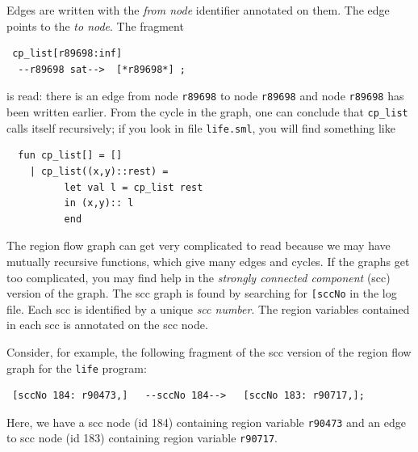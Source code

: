 \documentclass[12pt]{book}
\begin{document}
Edges are written with the {\em from node\/} identifier annotated on
them. The edge points to the \emph{to node}. The fragment
\begin{verbatim}
 cp_list[r89698:inf]
  --r89698 sat-->  [*r89698*] ;
\end{verbatim}
is read: there is an edge from node \texttt{r89698} to node
\texttt{r89698} and node \texttt{r89698} has been written earlier. From
the cycle in the graph, one can conclude that \texttt{cp\_list} calls
itself recursively; if you look in file {\tt life.sml}, you will
find something like
\begin{verbatim}
  fun cp_list[] = []
    | cp_list((x,y)::rest) = 
          let val l = cp_list rest
          in (x,y):: l
          end
\end{verbatim}


The region flow graph can get very complicated to read because we may have
mutually recursive functions, which give many edges and cycles.  If the
graphs get too complicated, you may find help in the 
%
{\em strongly connected component\/} (scc) version of the graph.  The
scc graph is found by searching for \texttt{[sccNo} in the log file.
Each scc is identified by a unique {\em scc number}. The region
variables contained in each scc is annotated on the scc node.

Consider, for example, the following fragment of the scc version of
the region flow graph for the {\tt life} program:
\begin{verbatim}
 [sccNo 184: r90473,]   --sccNo 184-->   [sccNo 183: r90717,];
\end{verbatim}
Here, we have a scc node (id 184) containing region variable
\texttt{r90473} and an edge to scc node (id 183) containing region
variable \texttt{r90717}.

\end{document}
